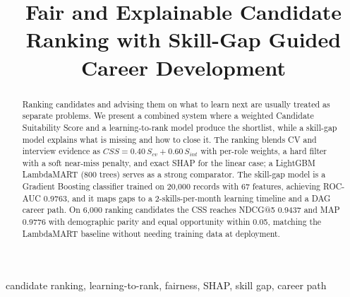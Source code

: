 \documentclass[conference]{IEEEtran}
\begin{document}
\title{Fair and Explainable Candidate Ranking with Skill-Gap Guided Career Development}

\author{
    \and
    \and
}

\maketitle

\begin{abstract}
Ranking candidates and advising them on what to learn next are usually treated as separate problems. We present a combined system where a weighted Candidate Suitability Score and a learning-to-rank model produce the shortlist, while a skill-gap model explains what is missing and how to close it. The ranking blends CV and interview evidence as $CSS = 0.40\,S_{cv} + 0.60\,S_{int}$ with per-role weights, a hard filter with a soft near-miss penalty, and exact SHAP for the linear case; a LightGBM LambdaMART (800 trees) serves as a strong comparator. The skill-gap model is a Gradient Boosting classifier trained on 20,000 records with 67 features, achieving ROC-AUC 0.9763, and it maps gaps to a 2-skills-per-month learning timeline and a DAG career path. On 6,000 ranking candidates the CSS reaches NDCG@5 0.9437 and MAP 0.9776 with demographic parity and equal opportunity within 0.05, matching the LambdaMART baseline without needing training data at deployment.
\end{abstract}

\begin{IEEEkeywords}
candidate ranking, learning-to-rank, fairness, SHAP, skill gap, career path
\end{IEEEkeywords}
\end{document}
